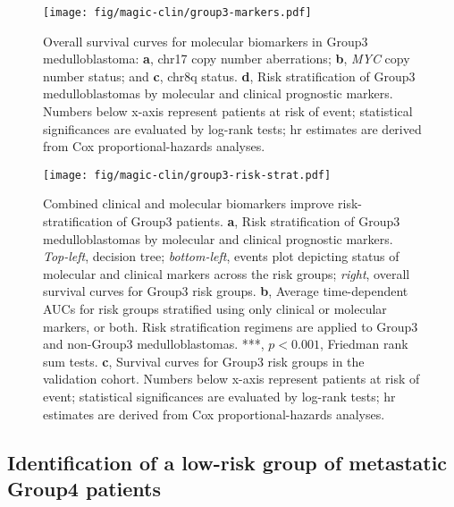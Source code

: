 \bigskip

\begin{figure}[h]
	\begin{center}
		\texttt{[image: fig/magic-clin/group3-markers.pdf]}
	\end{center}
	\caption[Overall survival curves for molecular biomarkers in Group3 medulloblastoma]
	{
	Overall survival curves for molecular biomarkers in Group3 medulloblastoma:
	\textbf{a}, chr17 copy number aberrations;
	\textbf{b}, \emph{MYC} copy number status; and 
	\textbf{c}, chr8q status.
	\textbf{d}, Risk stratification of Group3 medulloblastomas by molecular and clinical prognostic markers.
	Numbers below x-axis represent patients at risk of event; statistical significances are evaluated by log-rank tests; \gls{hr} estimates are derived from Cox proportional-hazards analyses.
	}
	\label{fig:group3-markers}
\end{figure}

\clearpage

\begin{figure}[h]
	\begin{center}
		\texttt{[image: fig/magic-clin/group3-risk-strat.pdf]}
	\end{center}
	\caption[Combined clinical and molecular biomarkers improve risk-stratification of Group3 patients.]
	{
	Combined clinical and molecular biomarkers improve risk-stratification of Group3 patients.
	\textbf{a}, Risk stratification of Group3 medulloblastomas by molecular and clinical prognostic markers.	\emph{Top-left}, decision tree; \emph{bottom-left}, events plot depicting status of molecular and clinical markers across the risk groups; \emph{right}, overall survival curves for Group3 risk groups.
	\textbf{b}, Average time-dependent AUCs for risk groups stratified using only clinical or molecular markers, or both. Risk stratification regimens are applied to Group3 and non-Group3 medulloblastomas. ***, $p < 0.001$, Friedman rank sum tests.
	\textbf{c}, Survival curves for Group3 risk groups in the validation cohort.
	Numbers below x-axis represent patients at risk of event; statistical significances are evaluated by log-rank tests; \gls{hr} estimates are derived from Cox proportional-hazards analyses.
	}
	\label{fig:group3-risk-strat}
\end{figure}

\clearpage


\subsection{Identification of a low-risk group of metastatic Group4 patients}

